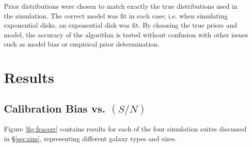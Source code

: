 \documentclass[12pt,preprint]{aastex}
\newcommand{\sn}{$(S/N)$}
\begin{document}
Prior distributions were chosen to match exactly the true distributions used in
the simulation.  The correct model was fit in each case; i.e. when simulating
exponential disks, an exponential disk was fit.  By choosing the true priors
and model, the accuracy of the algorithm is tested without confusion with other
issues such as model bias or empirical prior determination.

\section{Results} \label{sec:results}

\subsection{Calibration Bias vs. \sn} \label{sec:snbias}

Figure \ref{fig:fracerr} contains results for each of the four simulation
suites discussed in \S \ref{sec:sim}, representing different galaxy types and
sizes. 
\end{document}
